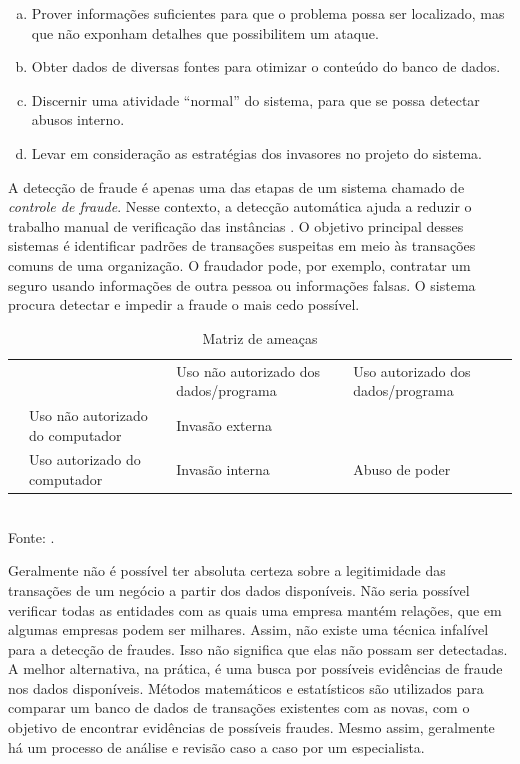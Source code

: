\begin{enumerate}[a)]
    \item Prover informações suficientes para que o problema possa ser localizado, mas que não exponham detalhes que possibilitem um ataque.
    \item Obter dados de diversas fontes para otimizar o conteúdo do banco de dados.
    \item Discernir uma atividade ``normal'' do sistema, para que se possa detectar abusos interno.
    \item Levar em consideração as estratégias dos invasores no projeto do sistema.
\end{enumerate}

A detecção de fraude é apenas uma das etapas de um sistema chamado de \emph{controle de fraude}. Nesse contexto, a detecção automática ajuda a reduzir o trabalho manual de verificação das instâncias \cite{Phua2010}. O objetivo principal desses sistemas é identificar padrões de transações suspeitas em meio às transações comuns de uma organização. O fraudador pode, por exemplo, contratar um seguro usando informações de outra pessoa ou informações falsas. O sistema procura detectar e impedir a fraude o mais cedo possível.

\renewcommand{\arraystretch}{1.5}
\begin{table}[h!]
    \vspace{0.5cm}
    \centering
    \caption{Matriz de ameaças}
    \label{fraud:and}
    \vspace{0.5cm}
    \begin{tabular}{c p{4cm}|>{\centering\arraybackslash}p{4cm}|>{\centering\arraybackslash}p{4cm}|}
        \cline{3-4}
        & & Uso não autorizado dos dados/programa & Uso autorizado dos dados/programa \\
        \hhline{~---}
        \multicolumn{0}{c|}{} & Uso não autorizado do computador & Invasão externa & \cellcolor{gray!90} \\
        \cline{2-4}
        \multicolumn{0}{c|}{} & Uso autorizado do computador & Invasão interna & Abuso de poder \\
        \cline{2-4}
    \end{tabular}
    \vspace{0.5cm}
    \\ Fonte: \cite{Anderson1972}.
    \vspace{0.5cm}
\end{table}

Geralmente não é possível ter absoluta certeza sobre a legitimidade das transações de um negócio a partir dos dados disponíveis. Não seria possível verificar todas as entidades com as quais uma empresa mantém relações, que em algumas empresas podem ser milhares. Assim, não existe uma técnica infalível para a detecção de fraudes. Isso não significa que elas não possam ser detectadas. A melhor alternativa, na prática, é uma busca por possíveis evidências de fraude nos dados disponíveis. Métodos matemáticos e estatísticos são utilizados para comparar um banco de dados de transações existentes com as novas, com o objetivo de encontrar evidências de possíveis fraudes. Mesmo assim, geralmente há um processo de análise e revisão caso a caso por um especialista.

